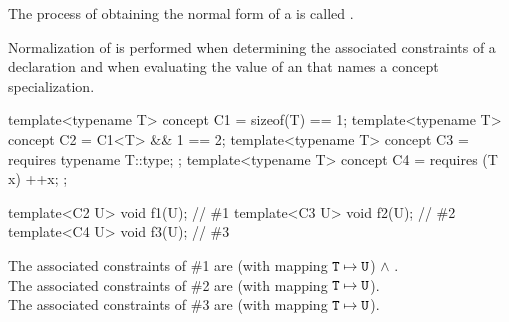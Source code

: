 \documentclass{wg21}
\begin{document}
\pnum
The process of obtaining the normal form of a
is called
.
\begin{note}
    Normalization of 
    is performed
    when determining the associated constraints
    of a declaration
    and
    when evaluating the value of an 
    that names a concept specialization.
\end{note}

\pnum
\begin{example}
    \begin{codeblock}
        template<typename T> concept C1 = sizeof(T) == 1;
        template<typename T> concept C2 = C1<T> && 1 == 2;
        template<typename T> concept C3 = requires { typename T::type; };
        template<typename T> concept C4 = requires (T x) { ++x; };

        template<C2 U> void f1(U);      // \#1
        template<C3 U> void f2(U);      // \#2
        template<C4 U> void f3(U);      // \#3
    \end{codeblock}
    The associated constraints of \#1 are
     (with mapping $\texttt{T} \mapsto \texttt{U}$) $\land$ .\\
    The associated constraints of \#2 are
     (with mapping $\texttt{T} \mapsto \texttt{U}$).\\
    The associated constraints of \#3 are
     (with mapping $\texttt{T} \mapsto \texttt{U}$).
\end{example}
\end{document}
